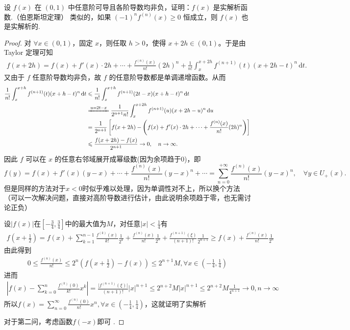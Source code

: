 \documentclass[../../main.tex]{subfiles}%
\begin{document}
\begin{example}
设 \( f(x) \) 在 \( (0,1) \) 中任意阶可导且各阶导数均非负，证明：\( f(x) \) 是实解析函数.（伯恩斯坦定理） 
类似的，如果 \( (-1)^n f^{(n)}(x) \geqslant  0 \) 恒成立，则 \( f(x) \) 也是实解析的. 
\end{example}
\begin{proof}
对 \(\forall x \in (0,1)\)，固定 \(x\)，则任取 \(h>0\)，使得 \(x+2h \in (0,1)\)。于是由 Taylor 定理可知
\begin{align*}
f(x+2h) = f(x) + f'(x) \cdot 2h + \cdots + \frac{f^{(n)}(x)}{n!} (2h)^n + \frac{1}{n!} \int_x^{x+2h} f^{(n+1)}(t) (x+2h-t)^n \, \mathrm{d}t.
\end{align*}
又由于 \(f\) 任意阶导数均非负，故 \(f\) 的任意阶导数都是单调递增函数。从而
\begin{align*}
\frac{1}{n!} \int_x^{x+h} f^{(n+1)}(t) (x+h-t)^n \, \mathrm{d}t &\leqslant \frac{1}{n!} \int_x^{x+h} f^{(n+1)}(2t-x) (x+h-t)^n \, \mathrm{d}t \\
&\xlongequal{u=2t-x} \frac{1}{2^{n+1} n!} \int_x^{x+2h} f^{(n+1)}(u) (x+2h-u)^n \, \mathrm{d}u \\
&= \frac{1}{2^{n+1}} \left[ f(x+2h) - \left( f(x) + f'(x) \cdot 2h + \cdots + \frac{f^{(n)}(x)}{n!} (2h)^n \right) \right] \\
&\leqslant \frac{f(x+2h) - f(x)}{2^{n+1}} \to 0, \quad n \to \infty.
\end{align*}
因此 \(f\) 可以在 \(x\) 的任意右邻域展开成幂级数(因为余项趋于0)，即
\[
f(y) = f(x) + f'(x) (y-x) + \cdots + \frac{f^{(n)}(x)}{n!} (y-x)^n + \cdots = \sum_{n=0}^{+\infty} \frac{f^{(n)}(x)}{n!} (y-x)^n, \quad \forall y \in U_+(x).
\]
但是同样的方法对于\(x < 0\)时似乎难以处理，因为单调性对不上，所以换个方法（可以一次解决问题，直接对高阶导数进行估计，由此说明余项趋于零，也无需讨论正负）

设\(\vert f(x)\vert\)在\([-\frac{3}{4},\frac{3}{4}]\)中的最大值为\(M\)，对任意\(\vert x\vert<\frac{1}{4}\)有
\begin{align*}
f\left(x + \frac{1}{2}\right)=f(x)+\sum_{k = 1}^{n - 1}\frac{f^{(k)}(x)}{k!}\frac{1}{2^{k}}+\frac{f^{(n)}(x)}{n!}\frac{1}{2^{n}}+\frac{f^{(n + 1)}(\xi)}{(n + 1)!}\frac{1}{2^{n + 1}}\geqslant  f(x)+\frac{f^{(n)}(x)}{n!}\frac{1}{2^{n}}
\end{align*}
由此得到
\begin{align*}
0\leqslant \frac{f^{(n)}(x)}{n!}\leqslant  2^{n}\left(f\left(x+\frac{1}{2}\right)-f(x)\right)\leqslant  2^{n + 1}M,\forall x\in\left(-\frac{1}{4},\frac{1}{4}\right)
\end{align*}
进而
\begin{align*}
\left\vert f(x)-\sum_{k = 0}^{n}\frac{f^{(k)}(0)}{k!}x^{k}\right\vert=\frac{\vert f^{(n + 1)}(\xi)\vert}{(n + 1)!}\vert x\vert^{n + 1}\leqslant  2^{n + 2}M\vert x\vert^{n + 1}\leqslant  2^{n + 2}M\frac{1}{4^{n + 1}}\to 0,n\to\infty
\end{align*}
所以\(f(x)=\sum_{n = 0}^{\infty}\frac{f^{(n)}(0)}{n!}x^{n},\forall x\in\left(-\frac{1}{4},\frac{1}{4}\right)\)，这就证明了实解析

对于第二问，考虑函数\(f(-x)\)即可 .
\end{proof}
\end{document}
